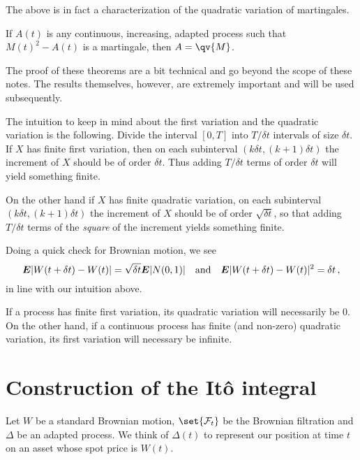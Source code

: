 The above is in fact a characterization of the quadratic variation of martingales.

\begin{theorem}\label{t:qv2}
  If $A(t)$ is any continuous, increasing, adapted process such that $M(t)^2 - A(t)$ is a martingale, then $A = \qv{M}$.
\end{theorem}

The proof of these theorems are a bit technical and go beyond the scope of these notes.
The results themselves, however, are extremely important and will be used subsequently.

\begin{remark}
  The intuition to keep in mind about the first variation and the quadratic variation is the following.
  Divide the interval $[0, T]$ into $T/\delta t$ intervals of size $\delta t$.
  If $X$ has finite first variation, then on each subinterval $(k \delta t, (k+1) \delta t)$ the increment of $X$ should be of order $\delta t$.
  Thus adding $T / \delta t$ terms of order $\delta t$ will yield something finite.

  On the other hand if $X$ has finite quadratic variation, on each subinterval $(k \delta t, (k+1) \delta t)$ the increment of $X$ should be of order $\sqrt{\delta t}$, so that adding $T / \delta t$ terms of the \emph{square} of the increment yields something finite.

  Doing a quick check for Brownian motion, we see
  \begin{equation*}
    \bm{E} \lvert W(t + \delta t) - W(t)\rvert = \sqrt{\delta t} \bm{E} \lvert N(0, 1)\rvert
    \quad\text{and}\quad
    \bm{E} \lvert W(t + \delta t) - W(t)\rvert^2 = \delta t\,,
  \end{equation*}
  in line with our intuition above.
\end{remark}

\begin{remark}
  If a process has finite first variation, its quadratic variation will necessarily be $0$.
  On the other hand, if a continuous process has finite (and non-zero) quadratic variation, its first variation will necessary be infinite.
\end{remark}


\section{Construction of the It\^o integral}

Let $W$ be a standard Brownian motion, $\set{\mathcal F_t}$ be the Brownian filtration and $\Delta$ be an adapted process.
We think of $\Delta(t)$ to represent our position at time $t$ on an asset whose spot price is $W(t)$.

